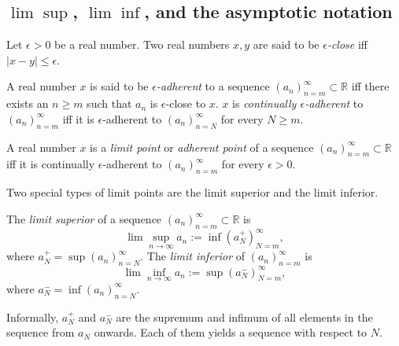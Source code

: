 \subsection{$\lim\sup$, $\lim\inf$, and
  the asymptotic notation}
\label{sec:limSupLimInfAsympNotatation}


\begin{defn}
  Let $\epsilon>0$ be a real number.
  Two real numbers $x,y$ are said to be \emph{$\epsilon$-close}
  iff $|x-y|\le \epsilon$.
\end{defn}

\begin{defn}
  A real number $x$ is said to be \emph{$\epsilon$-adherent}
  to a sequence $(a_n)_{n=m}^{\infty}\subset \mathbb{R}$
  iff there exists an $n\ge m$ such that
  $a_n$ is $\epsilon$-close to $x$.
  $x$ is \emph{continually $\epsilon$-adherent} to
  $(a_n)_{n=m}^{\infty}$
  iff it is $\epsilon$-adherent to $(a_n)_{n=N}^{\infty}$
  for every $N\ge m$.
\end{defn}

\begin{defn}
  \label{def:limitPointInR}
  A real number $x$ is a \emph{limit point} or \emph{adherent point}
  of a sequence $(a_n)_{n=m}^{\infty}\subset \mathbb{R}$ 
  iff it is continually $\epsilon$-adherent to
  $(a_n)_{n=m}^{\infty}$ for every $\epsilon> 0$.
\end{defn}

\begin{rem}
  Two special types of limit points are the limit superior
  and the limit inferior.
\end{rem}

\begin{defn}
  \label{def:limSupLimInf}
  The \emph{limit superior} of a sequence
  $(a_n)_{n=m}^{\infty}\subset \mathbb{R}$ is
  \begin{equation}
    \label{eq:limsup}
    \lim \sup_{n\rightarrow \infty} a_n := \inf (a_N^+)_{N=m}^{\infty}, 
  \end{equation}
  where $a_N^+=\sup(a_n)_{n=N}^{\infty}$.
  The \emph{limit inferior} of $(a_n)_{n=m}^{\infty}$ is
  \begin{equation}
    \label{eq:liminf}
    \lim \inf_{n\rightarrow \infty} a_n := \sup (a_N^-)_{N=m}^{\infty}, 
  \end{equation}
  where $a_N^-=\inf(a_n)_{n=N}^{\infty}$.
\end{defn}

\begin{rem}
  Informally, $a_N^+$ and $a_N^-$ are the supremum and infimum
  of all elements in the sequence from $a_N$ onwards.
  Each of them yields a sequence with respect to $N$.
\end{rem}

